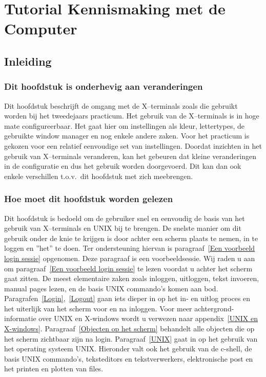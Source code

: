 \section{Tutorial Kennismaking met de Computer}

\subsection{Inleiding}
\subsubsection{Dit hoofdstuk is onderhevig aan veranderingen}

Dit hoofdstuk beschrijft de omgang met de X--terminals zoals die gebruikt
worden bij het tweedejaars practicum.
Het gebruik van de X--terminals is in hoge mate configureerbaar.
Het gaat hier om instellingen als kleur, lettertypes, de gebruikte
window manager en nog enkele andere zaken.
Voor het practicum is gekozen voor een relatief eenvoudige set
van instellingen.
Doordat inzichten in het gebruik van X--terminals veranderen, kan het
gebeuren dat kleine veranderingen in de configuratie en dus
het gebruik worden doorgevoerd.
Dit kan dan ook enkele verschillen t.o.v.\ dit hoofdstuk met zich meebrengen.

\subsubsection{Hoe moet dit hoofdstuk worden gelezen}

Dit hoofdstuk is bedoeld om de gebruiker snel en eenvoudig de
basis van het gebruik van X--terminals en UNIX bij te brengen.
De snelste manier om dit gebruik onder de knie te krijgen is door
achter een scherm plaats te nemen, in te loggen en ''het'' te doen.
Ter ondersteuning hiervan is paragraaf~\ref{Een voorbeeld login sessie}
opgenomen. Deze paragraaf is een voorbeeldsessie.
Wij raden u aan om paragraaf~\ref{Een voorbeeld login sessie}
te lezen voordat u achter het scherm gaat zitten.
\newline
De meest elementaire zaken zoals inloggen, uitloggen, tekst invoeren,
manual pages lezen, en de basis UNIX commando's komen aan bod.
Paragrafen~\ref{Login},~\ref{Logout} gaan iets dieper in op het in- en
uitlog proces en het uiterlijk van het scherm voor en na inloggen.
Voor meer achtergrond-informatie over UNIX en X-windows wordt u
verwezen naar appendix~\ref{UNIX en X-windows}.
Paragraaf~\ref{Objecten op het scherm} behandelt alle objecten die op
het scherm zichtbaar zijn na login.
Paragraaf~\ref{UNIX} gaat in op het gebruik van het operating systeem UNIX.
Hieronder valt ook het gebruik van de c-shell, de basis UNIX commando's,
teksteditors en tekstverwerkers, elektronische post en het printen en plotten
van files.

